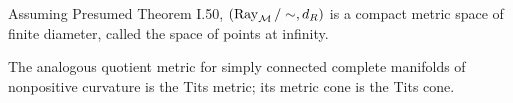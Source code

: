 \begin{claim}
\label{clm:chow-iii-i54-points-at-infinity}

Assuming Presumed Theorem I.50, $(\operatorname{Ray}_{\mathcal M}/\sim,d_R)$ is a compact metric space of
finite diameter, called the space of points at infinity.
\end{claim}

\begin{remark}
\label{rem:chow-iii-i55-tits-metric}
The analogous quotient metric for simply connected complete manifolds of
nonpositive curvature is the Tits metric; its metric cone is the Tits cone.
\end{remark}
